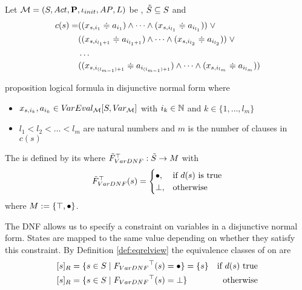 \documentclass[preview]{standalone}
\begin{document}
\begin{definition}
	Let $\chgph = \chgphtuple$ be \achgphN, $\smstates \subseteq \states$ and 
	\begin{align*}
		c(s) = &((\varstate[,i_1] \eqorneq \varval_{i_1}) \land \dots \land (\varstate[,i_{l_1}] \eqorneq \varval_{i_{l_1}})) \; \lor \\
		&((\varstate[,i_{l_1+1}] \eqorneq \varval_{i_{l_1+1}}) \land \dots \land (\varstate[,i_{l_2}] \eqorneq \varval_{i_{l_2}})) \; \lor \\
		&\dots \\ 
		&((\varstate[,i_{(l_{m-1})+1}] \eqorneq \varval_{i_{(l_{m-1})+1}}) \land \dots \land (\varstate[,i_{l_m}] \eqorneq \varval_{i_{l_m}}))
	\end{align*}
	
	proposition logical formula in disjunctive normal form where
	\begin{itemize}
		\item $\varstate[,i_k], a_{i_k} \in \varevalimg$ with $i_k\in \natnums$ and $k \in \{1, \dots, l_m\}$
		\item $l_1 < l_2 < \dots < l_m$ are natural numbers and $m$ is the number of clauses in $c(s)$
	\end{itemize}		
	The \viewN \viewparamdnf is defined by its \grpfctN \gfctparamdnf where $\gfctsubparamdnf : \smstates \to \imggrp$ with
	\[
	\gfctsubparamdnf(\state) =
	\begin{cases}
			\remelem, &\text{if } d(s) \text{ is true}\\
			\notppty, 	&\text{otherwise}
		\end{cases}
	\]
	where $\imggrp := \{\group, \remelem\}$.
\end{definition}

The DNF allows us to specify a constraint on variables in a disjunctive normal form. States are mapped to the same value depending on whether they satisfy this constraint.
By Definition \ref{def:eqrelview} the equivalence classes of \eqrelview on \states are
\begin{align*}
	\eqclassv &= \{\state \in \states \mid \gfctparamdnf(\state) = \remelem\} = \{\state\} &\text{if } d(s) \text{ true} \\
	\eqclassv &= \{\state \in \states \mid \gfctparamdnf(\state) = \notppty\} &\text{otherwise}
\end{align*}
\end{document}
